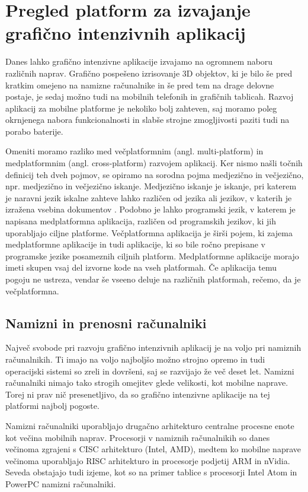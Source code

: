 \chapter{Pregled platform za izvajanje grafično intenzivnih aplikacij}

Danes lahko grafično intenzivne aplikacije izvajamo na ogromnem naboru različnih naprav. Grafično pospešeno izrisovanje 3D objektov, ki je bilo še pred kratkim omejeno na namizne računalnike in še pred tem na drage delovne postaje, je sedaj možno tudi na mobilnih telefonih in grafičnih tablicah. Razvoj aplikacij za mobilne platforme je nekoliko bolj zahteven, saj moramo poleg okrnjenega nabora funkcionalnosti in slabše strojne zmogljivosti paziti tudi na porabo baterije.

Omeniti moramo razliko med večplatformnim (angl. multi-platform) in medplatformnim (angl. cross-platform) razvojem aplikacij. Ker nismo našli točnih definicij teh dveh pojmov, se opiramo na sorodna pojma medjezično in večjezično, npr. medjezično in večjezično iskanje. Medjezično iskanje je iskanje, pri katerem je naravni jezik iskalne zahteve lahko različen od jezika ali jezikov, v katerih je izražena vsebina dokumentov \cite{jezicno}. Podobno je lahko programski jezik, v katerem je napisana medplatformna aplikacija, različen od programskih jezikov, ki jih uporabljajo ciljne platforme. Večplatformna aplikacija je širši pojem, ki zajema medplatformne aplikacije in tudi aplikacije, ki so bile ročno prepisane v programske jezike posameznih ciljnih platform. Medplatformne aplikacije morajo imeti skupen vsaj del izvorne kode na vseh platformah. Če aplikacija temu pogoju ne ustreza, vendar še vseeno deluje na različnih platformah, rečemo, da je večplatformna.

\section{Namizni in prenosni računalniki}

Največ svobode pri razvoju grafično intenzivnih aplikacij je na voljo pri namiznih računalnikih. Ti imajo na voljo najboljšo možno strojno opremo in tudi operacijski sistemi so zreli in dovršeni, saj se razvijajo že več deset let. Namizni računalniki nimajo tako strogih omejitev glede velikosti, kot mobilne naprave. Torej ni prav nič presenetljivo, da so grafično intenzivne aplikacije na tej platformi najbolj pogoste. 

Namizni računalniki uporabljajo drugačno arhitekturo centralne procesne enote kot večina mobilnih naprav. Procesorji v namiznih računalnikih so danes večinoma  zgrajeni s CISC arhitekturo (Intel, AMD), medtem ko mobilne naprave večinoma uporabljajo RISC arhitekturo in procesorje podjetij ARM in nVidia. Seveda obstajajo tudi izjeme, kot so na primer tablice s procesorji Intel Atom in PowerPC namizni računalniki.  


